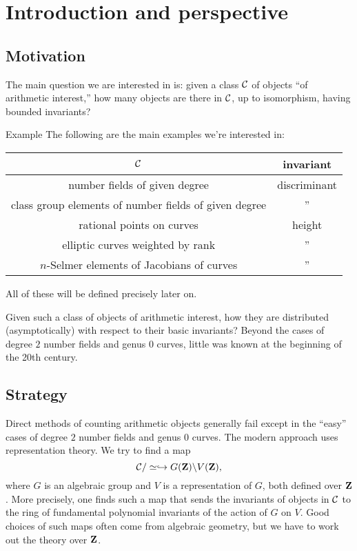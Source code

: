 
\section{Introduction and perspective}\label{sec:bhargava-i}





\subsection{Motivation}

The main question we are interested in is: given a class $\mathcal{C}$ of objects ``of 
arithmetic interest,'' how many objects are there in $\mathcal{C}$, up to isomorphism, 
having bounded invariants? 

\begin{enonce}[remark]{Example}
The following are the main examples we're interested in: 
\begin{center}
\begin{tabular}{c|c}
$\mathcal{C}$ & invariant \\ \hline
number fields of given degree & discriminant \\
class group elements of number fields of given degree & '' \\
rational points on curves & height \\
elliptic curves weighted by rank & '' \\
$n$-Selmer elements of Jacobians of curves & '' 
\end{tabular}
\end{center}
All of these will be defined precisely later on. 
\end{enonce}

Given such a class of objects of arithmetic interest, how they are distributed 
(asymptotically) with respect to their basic invariants? Beyond the cases of 
degree $2$ number fields and genus $0$ curves, little was known at the 
beginning of the 20th century. 





\subsection{Strategy}

Direct methods of counting arithmetic objects generally fail except in the 
``easy'' cases of degree $2$ number fields and genus $0$ curves. The modern 
approach uses representation theory. We try to find a map 
\[
  \mathcal{C}/\simeq \hookrightarrow G(\mathbf{Z})\backslash V(\mathbf{Z}) ,
\]
where $G$ is an algebraic group and $V$ is a representation of $G$, both 
defined over $\mathbf{Z}$. More precisely, one finds such a map that sends the 
invariants of objects in $\mathcal{C}$ to the ring of fundamental polynomial 
invariants of the action of $G$ on $V$. Good choices of such maps often come 
from algebraic geometry, but we have to work out the theory over $\mathbf{Z}$. 

